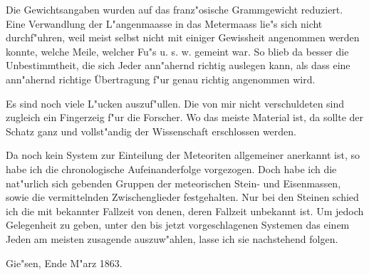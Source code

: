 \documentclass[a4paper, 11pt, oneside]{article}
\begin{document}
Die Gewichtsangaben wurden auf das franz"osische Grammgewicht reduziert. Eine Verwandlung der L"angenmaasse in das Metermaass lie"s sich nicht durchf"uhren, weil meist selbst nicht mit einiger Gewissheit angenommen werden konnte, welche Meile, welcher Fu"s u. s. w. gemeint war. So blieb da besser die Unbestimmtheit, die sich Jeder ann"ahernd richtig auslegen kann, als dass eine ann"ahernd richtige Übertragung f"ur genau richtig angenommen wird.

Es sind noch viele L"ucken auszuf"ullen. Die von mir nicht verschuldeten sind zugleich ein Fingerzeig f"ur die Forscher. Wo das meiste Material ist, da sollte der Schatz ganz und vollst"andig der Wissenschaft erschlossen werden.

Da noch kein System zur Einteilung der Meteoriten allgemeiner anerkannt ist, so habe ich die chronologische Aufeinanderfolge vorgezogen. Doch habe ich die nat"urlich sich gebenden Gruppen der meteorischen Stein- und Eisenmassen, sowie die vermittelnden Zwischenglieder festgehalten. Nur bei den Steinen schied ich die mit bekannter Fallzeit von denen, deren Fallzeit unbekannt ist. Um jedoch Gelegenheit zu geben, unter den bis jetzt vorgeschlagenen Systemen das einem Jeden am meisten zusagende auszuw"ahlen, lasse ich sie nachstehend folgen.

Gie"sen, Ende M"arz 1863.
\clearpage
\end{document}
